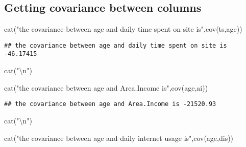 \documentclass[
]{article}
\newenvironment{Shaded}{\begin{snugshade}}{\end{snugshade}}
\newcommand{\FunctionTok}[1]{\textcolor[rgb]{0.00,0.00,0.00}{#1}}
\newcommand{\NormalTok}[1]{#1}
\newcommand{\SpecialCharTok}[1]{\textcolor[rgb]{0.00,0.00,0.00}{#1}}
\newcommand{\StringTok}[1]{\textcolor[rgb]{0.31,0.60,0.02}{#1}}
\begin{document}
\hypertarget{getting-covariance-between-columns}{%
\subsection{Getting covariance between
columns}\label{getting-covariance-between-columns}}

\begin{Shaded}
\begin{Highlighting}[]
\FunctionTok{cat}\NormalTok{(}\StringTok{"the covariance between age and daily time spent on site is"}\NormalTok{,}\FunctionTok{cov}\NormalTok{(ts,age))}
\end{Highlighting}
\end{Shaded}

\begin{verbatim}
## the covariance between age and daily time spent on site is -46.17415
\end{verbatim}

\begin{Shaded}
\begin{Highlighting}[]
\FunctionTok{cat}\NormalTok{(}\StringTok{"}\SpecialCharTok{\textbackslash{}n}\StringTok{"}\NormalTok{)}
\end{Highlighting}
\end{Shaded}

\begin{Shaded}
\begin{Highlighting}[]
\FunctionTok{cat}\NormalTok{(}\StringTok{"the covariance between age and Area.Income is"}\NormalTok{,}\FunctionTok{cov}\NormalTok{(age,ai))}
\end{Highlighting}
\end{Shaded}

\begin{verbatim}
## the covariance between age and Area.Income is -21520.93
\end{verbatim}

\begin{Shaded}
\begin{Highlighting}[]
\FunctionTok{cat}\NormalTok{(}\StringTok{"}\SpecialCharTok{\textbackslash{}n}\StringTok{"}\NormalTok{)}
\end{Highlighting}
\end{Shaded}

\begin{Shaded}
\begin{Highlighting}[]
\FunctionTok{cat}\NormalTok{(}\StringTok{"the covariance between age and daily internet usage is"}\NormalTok{,}\FunctionTok{cov}\NormalTok{(age,dis))}
\end{Highlighting}
\end{Shaded}
\end{document}
